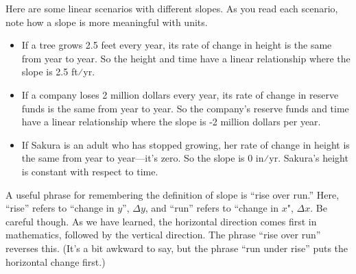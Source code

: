 \documentclass[nooutcomes]{ximera}
\begin{document}
Here are some linear scenarios with different slopes. As you read each scenario, note how a slope is more meaningful with units.
\begin{itemize} 
\item If a tree grows 2.5 feet every year, its rate of change in height is the same from year to year. So the height and time have a linear relationship where the slope is 2.5 ft⁄yr.
\item If a company loses 2 million dollars every year, its rate of change in reserve funds is the same from year to year. So the company's reserve funds and time have a linear relationship where the slope is -2  million dollars per year.
\item If Sakura is an adult who has stopped growing, her rate of change in height is the same from year to year—it's zero. So the slope is 0 in⁄yr. Sakura's height is constant with respect to time.
\end{itemize}


\begin{remark}
A useful phrase for remembering the definition of slope is ``rise over run.'' Here, ``rise'' refers to ``change in $y$'', $\Delta y$, and ``run'' refers to ``change in $x$", $\Delta x$. Be careful though. As we have learned, the horizontal direction comes first in mathematics, followed by the vertical direction. The phrase ``rise over run'' reverses this. (It's a bit awkward to say, but the phrase ``run under rise'' puts the horizontal change first.)
\end{remark}
\end{document}
